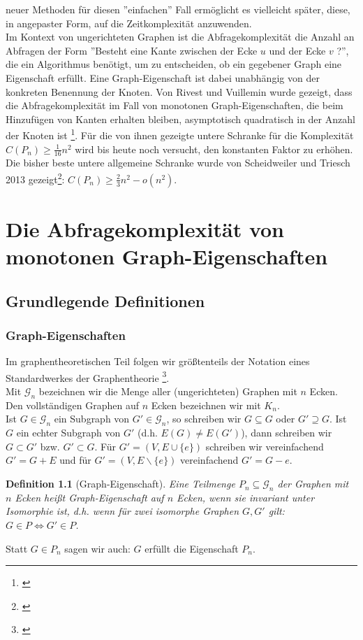 \documentclass[a4paper]{scrreprt}
\newtheorem{definition}{Definition}
\theoremstyle{definition}
\begin{document}
neuer Methoden für diesen ''einfachen'' Fall ermöglicht
es vielleicht später, diese, in angepaster Form, auf
die Zeitkomplexität anzuwenden.\\
Im Kontext von ungerichteten Graphen
ist die Abfragekomplexität die Anzahl
an Abfragen der Form ''Besteht eine Kante zwischen
der Ecke $u$ und der Ecke $v$ ?'', die ein Algorithmus
benötigt, um zu entscheiden, ob ein gegebener Graph
eine Eigenschaft erfüllt. Eine Graph-Eigenschaft ist
dabei unabhängig von der konkreten Benennung der Knoten.
Von Rivest und Vuillemin wurde gezeigt,
dass die Abfragekomplexität
im Fall von monotonen Graph-Eigenschaften, die beim 
Hinzufügen von Kanten erhalten bleiben, asymptotisch
quadratisch in der Anzahl der Knoten
ist \footnote{\cite{Rivest}}. Für die von
ihnen gezeigte untere Schranke für die Komplexität
$C(P_n) \geq \frac{1}{16}n^2$ wird bis heute noch
versucht, den konstanten Faktor zu erhöhen. Die bisher beste
untere allgemeine Schranke wurde von Scheidweiler
und Triesch 2013 gezeigt\footnote{\cite{Scheidweiler}}:
$C(P_n) \geq \frac{2}{3}n^2 - o(n^2)$.


\chapter{Die Abfragekomplexität von monotonen Graph-Eigenschaften}
\section{Grundlegende Definitionen}
\subsection{Graph-Eigenschaften}
Im graphentheoretischen Teil folgen wir größtenteils
der Notation eines Standardwerkes der Graphentheorie \footnote{\cite{diestel}}. \\
Mit $\mathcal{G}_n$ bezeichnen wir die Menge aller
(ungerichteten) Graphen mit $n$ Ecken. \\
Den vollständigen Graphen auf $n$ Ecken bezeichnen wir
mit $K_n$. \\
Ist $G \in \mathcal{G}_n$ ein Subgraph von $G' \in \mathcal{G}_n$,
so schreiben wir $G \subseteq G$ oder $G' \supseteq G$. Ist $G$ ein
echter Subgraph von $G'$ (d.h. $E(G) \neq E(G')$), dann schreiben
wir $G \subset G'$ bzw. $G' \subset G$.
Für $G' = (V, E \cup \{e\})$ schreiben wir vereinfachend
$G' = G + E$ und für $G' = (V, E \backslash \{e\})$ vereinfachend
$G' = G - e$.


\begin{definition}[Graph-Eigenschaft]
Eine Teilmenge $P_n \subseteq \mathcal{G}_n$ der Graphen mit
$n$ Ecken heißt \emph{Graph-Eigenschaft auf $n$ Ecken},
wenn sie invariant unter Isomorphie ist,
d.h. wenn für zwei isomorphe Graphen $G, G'$ gilt:
$G \in P \iff G' \in P$.
\end{definition}
Statt $G \in P_n$ sagen wir auch: $G$ erfüllt die Eigenschaft $P_n$.
\end{document}
